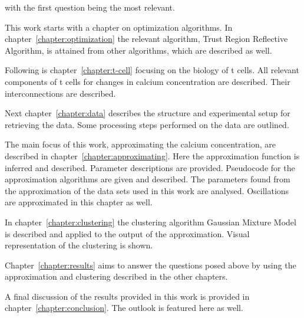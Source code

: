 with the first question being the most relevant.

\newpage
\noindent
This work starts with a chapter on optimization algorithms. In chapter~\ref{chapter:optimization} the relevant algorithm, Trust Region Reflective Algorithm, is attained from other algorithms, which are described as well.

Following is chapter~\ref{chapter:t-cell} focusing on the biology of t cells. All relevant components of t cells for changes in calcium concentration are described. Their interconnections are described.

Next chapter~\ref{chapter:data} describes the structure and experimental setup for retrieving the data. Some processing steps performed on the data are outlined.

The main focus of this work, approximating the calcium concentration, are described in chapter~\ref{chapter:approximating}. Here the approximation function is inferred and described. Parameter descriptions are provided. Pseudocode for the approximation algorithms are given and described. The parameters found from the approximation of the data sets used in this work are analysed. Oscillations are approximated in this chapter as well.

In chapter~\ref{chapter:clustering} the clustering algorithm Gaussian Mixture Model is described and applied to the output of the approximation. Visual representation of the clustering is shown.

Chapter~\ref{chapter:results} aims to answer the questions posed above by using the approximation and clustering described in the other chapters.

A final discussion of the results provided in this work is provided in chapter~\ref{chapter:conclusion}. The outlook is featured here as well.